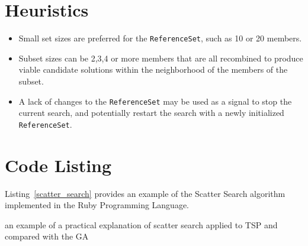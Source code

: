 \documentclass[a4paper, 11pt]{article}
\begin{document}
\section{Heuristics}
\label{sec:heuristics}
\begin{itemize}
	\item Small set sizes are preferred for the \texttt{ReferenceSet}, such as 10 or 20 members.
	\item Subset sizes can be 2,3,4 or more members that are all recombined to produce viable candidate solutions within the neighborhood of the members of the subset.
	\item A lack of changes to the \texttt{ReferenceSet} may be used as a signal to stop the current search, and potentially restart the search with a newly initialized \texttt{ReferenceSet}.	
\end{itemize}


\section{Code Listing}
\label{sec:code}
Listing~\ref{scatter_search} provides an example of the Scatter Search algorithm implemented in the Ruby Programming Language. 

an example of a practical explanation of scatter search applied to TSP and compared with the GA \cite{Marti2005}
\end{document}
